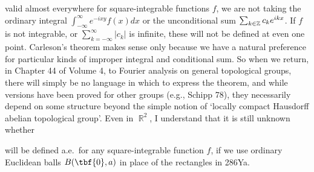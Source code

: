 {


\ifdim\pagewidth>467pt\tenrmstretch{3pt}\fi
\noindent valid almost everywhere for square-integrable functions $f$,
we are not taking the ordinary integral
$\int_{-\infty}^{\infty}e^{-ixy}f(x)dx$ or the unconditional sum
$\sum_{k\in\Bbb Z}c_ke^{ikx}$.   If $f$ is not integrable, or
$\sum_{k=-\infty}^{\infty}|c_k|$ is infinite, these will not be defined
at even one point.
Carleson's theorem makes sense only because we have a natural
preference for particular kinds of improper integral and conditional
sum.   So when we return, in Chapter 44 of Volume 4, to Fourier analysis
on general
topological groups, there will simply be no language in which to express
the theorem, and while versions have been proved for other groups (e.g.,
{\smc Schipp 78}),
they necessarily depend on some structure beyond the simple notion of
`locally compact Hausdorff abelian topological group'.   Even in
$\BbbR^2$, I understand that it is still unknown whether
\tenrmstretch{1.67pt}


\noindent will be defined a.e.\ for any square-integrable function $f$,
if we use ordinary Euclidean balls $B(\tbf{0},a)$ in place of the
rectangles in 286Ya.
}%

\frnewpage



